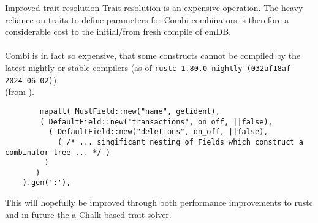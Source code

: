 \begin{futurebox}{Improved trait resolution}
    Trait resolution\cite{TraitSolving} is an expensive operation. The heavy reliance on traits to define parameters for Combi combinators 
    is therefore a considerable cost to the initial/from fresh compile of emDB.
    \\
    \\ Combi is in fact so expensive, that some constructs cannot be compiled by the latest nightly or stable compilers (as of \texttt{rustc 1.80.0-nightly (032af18af 2024-06-02)}).
    \\ (from ).
    \begin{verbatim}
        mapall( MustField::new("name", getident),
        ( DefaultField::new("transactions", on_off, ||false),
          ( DefaultField::new("deletions", on_off, ||false),
            ( /* ... singificant nesting of Fields which construct a combinator tree ... */ )
         )
       )
    ).gen(':'),
    \end{verbatim}
    This will hopefully be improved through both performance improvements to rustc and in future the a Chalk-based trait solver.\cite{ChalktraitSolver}
\end{futurebox}

